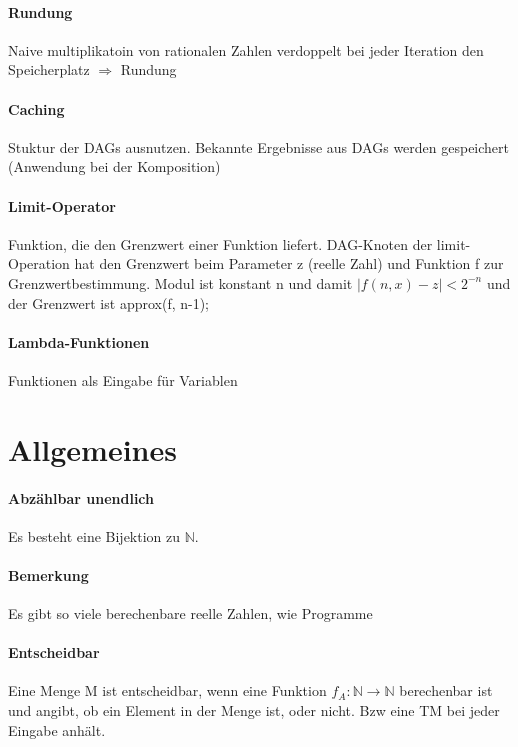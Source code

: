 \documentclass[ngerman]{scrartcl}
\begin{document}
\paragraph{Rundung}
Naive multiplikatoin von rationalen Zahlen verdoppelt bei jeder Iteration den Speicherplatz $ \Rightarrow $ Rundung

\paragraph{Caching}
 Stuktur der DAGs ausnutzen. Bekannte Ergebnisse aus DAGs werden gespeichert (Anwendung bei der Komposition)

\paragraph{Limit-Operator}
Funktion, die den Grenzwert einer Funktion liefert. DAG-Knoten der limit-Operation hat den Grenzwert beim Parameter z (reelle Zahl) und Funktion f zur Grenzwertbestimmung. Modul ist konstant n und damit  $ |f(n,x) - z| < 2^{-n} $ und der Grenzwert ist approx(f, n-1);

\paragraph{Lambda-Funktionen}
Funktionen als Eingabe für Variablen

%
%
\section{Allgemeines}

\paragraph{Abzählbar unendlich}
Es besteht eine Bijektion zu $ \mathbb{N} $.
\paragraph{Bemerkung} Es gibt so viele berechenbare reelle Zahlen, wie Programme

\paragraph{Entscheidbar}
Eine Menge M ist entscheidbar, wenn eine Funktion $ f_A : \mathbb{N} \rightarrow \mathbb{N} $ berechenbar ist und angibt, ob ein Element in der Menge ist, oder nicht. Bzw eine TM bei jeder Eingabe anhält.
\end{document}
